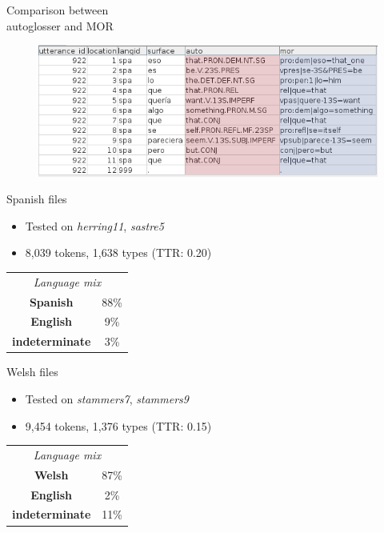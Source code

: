 \documentclass[hyperref={pdfpagelabels=false}, 14pt]{beamer}
\begin{document}
\begin{frame}{Comparison between \\ autoglosser and MOR}
  \begin{figure}[h]
  \centering
  \includegraphics[width=\textwidth]{images/comp.png}
  \end{figure}
\end{frame}


\begin{frame}{Spanish files}
\begin{itemize}
\item Tested on \textit{herring11}, \textit{sastre5}
\item 8,039 tokens, 1,638 types (TTR: 0.20)
\end{itemize}
\begin{center}
\begin{tabular}{cc}
\multicolumn{2}{c}{\textit{Language mix}} \\
\cline{1-2}\noalign{\smallskip}
\textbf{Spanish}     & 88\% \\
\textbf{English}    & 9\% \\
\textbf{indeterminate}    & 3\% \\
\end{tabular}
\end{center}
\end{frame}


\begin{frame}{Welsh files}
\begin{itemize}
\item Tested on \textit{stammers7}, \textit{stammers9}
\item 9,454 tokens, 1,376 types (TTR: 0.15)
\end{itemize}
\begin{center}
\begin{tabular}{cc}
\multicolumn{2}{c}{\textit{Language mix}} \\
\cline{1-2}\noalign{\smallskip}
\textbf{Welsh}     & 87\% \\
\textbf{English}    & 2\% \\
\textbf{indeterminate}    & 11\% \\
\end{tabular}
\end{center}
\end{frame}
\end{document}
